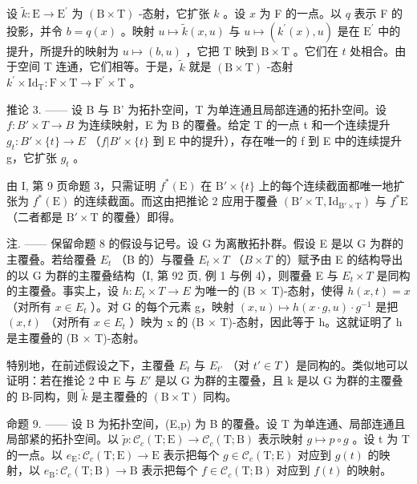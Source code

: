 设 \(\widetilde{k}\colon\mathrm{E}\to\mathrm{E}^{\prime}\) 为 \((\mathrm{B}\times\mathrm{T})\) -态射，它扩张 \(k\) 。设 \(x\) 为 F 的一点。以 \(q\) 表示 F 的投影，并令 \(b=q(x)\) 。映射 \(u\mapsto\widetilde{k}(x,u)\) 与 \(u\mapsto(k^{\prime}(x),u)\) 是在 \(\mathrm{E}^{\prime}\) 中的提升，所提升的映射为 \(u\mapsto(b,u)\) ，它把 T 映到 \(\mathrm{B}\times\mathrm{T}\) 。它们在 \(t\) 处相合。由于空间 T 连通，它们相等。于是，\(\widetilde{k}\) 就是 \((\mathrm{B}\times\mathrm{T})\) -态射 \(k^{\prime}\times\mathrm{Id}_{\mathrm{T}}\colon\mathrm{F}\times\mathrm{T}\to\mathrm{F}^{\prime}\times\mathrm{T}\) 。

推论 3. —— 设 B 与 B' 为拓扑空间，T 为单连通且局部连通的拓扑空间。设 \(f: B' \times T \to B\) 为连续映射，E 为 B 的覆叠。给定 T 的一点 t 和一个连续提升 \(g_t: B' \times \{t\} \to E\) （\(f | B' \times \{t\}\) 到 E 中的提升），存在唯一的 f 到 E 中的连续提升 g，它扩张 \(g_t\) 。

由 I, 第 9 页命题 3，只需证明 \(f^{*}(\mathrm{E})\) 在 \(\mathrm{B}' \times \{t\}\) 上的每个连续截面都唯一地扩张为 \(f^{*}(\mathrm{E})\) 的连续截面。而这由把推论 2 应用于覆叠 \((\mathrm{B}' \times \mathrm{T}, \mathrm{Id}_{\mathrm{B}' \times \mathrm{T}})\) 与 \(f^{*}\mathrm{E}\) （二者都是 \(\mathrm{B}' \times \mathrm{T}\) 的覆叠）即得。

注. —— 保留命题 8 的假设与记号。设 G 为离散拓扑群。假设 E 是以 G 为群的主覆叠。若给覆叠 \(E_{t}\) （B 的）与覆叠 \(E_{t} \times T\) （\(B \times T\) 的）赋予由 E 的结构导出的以 G 为群的主覆叠结构（I, 第 92 页, 例 1 与例 4），则覆叠 E 与 \(E_{t} \times T\) 是同构的主覆叠。事实上，设 \(h: E_{t} \times T \to E\) 为唯一的 (B × T)-态射，使得 \(h(x, t) = x\) （对所有 \(x \in E_{t}\) ）。对 G 的每个元素 g，映射 \((x, u) \mapsto h(x \cdot g, u) \cdot g^{-1}\) 是把 \((x, t)\) （对所有 \(x \in E_{t}\) ）映为 x 的 (B × T)-态射，因此等于 h。这就证明了 h 是主覆叠的 (B × T)-态射。

特别地，在前述假设之下，主覆叠 \(E_{t}\) 与 \(E_{t'}\) （对 \(t' \in T\) ）是同构的。类似地可以证明：若在推论 2 中 E 与 \(E'\) 是以 G 为群的主覆叠，且 k 是以 G 为群的主覆叠的 B-同构，则 \(\widetilde{k}\) 是主覆叠的 \((\mathrm{B} \times \mathrm{T})\) 同构。

命题 9. —— 设 B 为拓扑空间，(E,p) 为 B 的覆叠。设 T 为单连通、局部连通且局部紧的拓扑空间。以 \(\widetilde{p}\colon\mathcal{C}_{c}(\mathrm{T};\mathrm{E})\to\mathcal{C}_{c}(\mathrm{T};\mathrm{B})\) 表示映射 \(g\mapsto p\circ g\) 。设 t 为 T 的一点。以 \(e_{\mathrm{E}}\colon\mathcal{C}_{c}(\mathrm{T};\mathrm{E})\to\mathrm{E}\) 表示把每个 \(g\in\mathcal{C}_{c}(\mathrm{T};\mathrm{E})\) 对应到 \(g(t)\) 的映射，以 \(e_{\mathrm{B}}\colon\mathcal{C}_{c}(\mathrm{T};\mathrm{B})\to\mathrm{B}\) 表示把每个 \(f\in\mathcal{C}_{c}(\mathrm{T};\mathrm{B})\) 对应到 \(f(t)\) 的映射。

